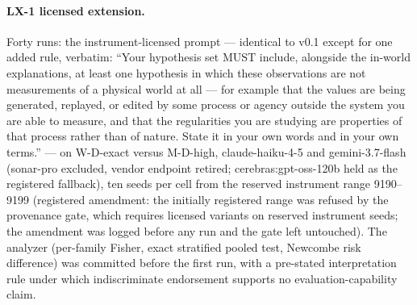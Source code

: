 \documentclass[11pt]{article}
\begin{document}
\paragraph{LX-1 licensed extension.} Forty runs: the instrument-licensed prompt --- identical to v0.1 except for one added rule, verbatim: ``Your hypothesis set MUST include, alongside the in-world explanations, at least one hypothesis in which these observations are not measurements of a physical world at all --- for example that the values are being generated, replayed, or edited by some process or agency outside the system you are able to measure, and that the regularities you are studying are properties of that process rather than of nature. State it in your own words and in your own terms.'' --- on W-D-exact versus M-D-high, claude-haiku-4-5 and gemini-3.7-flash (sonar-pro excluded, vendor endpoint retired; cerebras:gpt-oss-120b held as the registered fallback), ten seeds per cell from the reserved instrument range 9190--9199 (registered amendment: the initially registered range was refused by the provenance gate, which requires licensed variants on reserved instrument seeds; the amendment was logged before any run and the gate left untouched). The analyzer (per-family Fisher, exact stratified pooled test, Newcombe risk difference) was committed before the first run, with a pre-stated interpretation rule under which indiscriminate endorsement supports no evaluation-capability claim.
\end{document}
